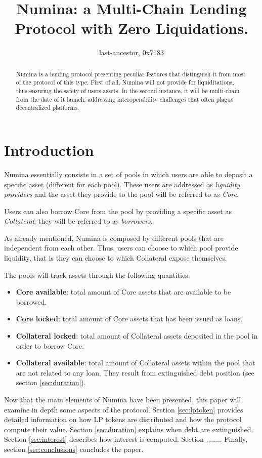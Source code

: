 \documentclass[12pt]{paper}
\title{Numina: a Multi-Chain Lending Protocol with Zero Liquidations.}
\author{last-ancestor, 0x7183}
\date{}
\begin{document}
\maketitle


\begin{abstract}
	Numina is a lending protocol presenting peculiar features that distinguish it from most of the protocol of this type. First of all, Numina will not provide for liquiditations, thus ensuring the safety of users assets. In the second instance, it will be multi-chain from the date of it launch,  addressing interoperability challenges that often plague decentralized platforms.
\end{abstract}
	

\section{Introduction}
\label{sec:introduction}
	Numina essentially consists in a set of pools in which users are able to deposit a specific asset (different for each pool). These users are addressed as \textit{liquidity providers} and the asset they provide to the pool will be referred to as \textit{Core}.
	\par Users can also borrow Core from the pool by providing a specific asset as \textit{Collateral}: they will be referred to as \textit{borrowers}.
	\par As already mentioned, Numina is composed by different pools that are independent from each other. Thus, users can choose to which pool provide liquidity, that is they can choose to which Collateral expose themselves.
	\par The pools will track assets through the following quantities.
	\begin{itemize}
		\item \textbf{Core available}: total amount of Core assets that are available to be borrowed.
		\item \textbf{Core locked}: total amount of Core assets that has been issued as loans.
		\item \textbf{Collateral locked}: total amount of Collateral assets deposited in the pool in order to borrow Core.
		\item \textbf{Collateral available}: total amount of Collateral assets within the pool that are not related to any loan. They result from extinguished debt position (see section \ref{sec:duration}).
	\end{itemize} 
	Now that the main elements of Numina have been presented, this paper will examine in depth some aspects of the protocol. Section \ref{sec:lptoken} provides detailed information on how LP tokens are distributed and how the protocol compute their value. Section \ref{sec:duration} explains when debt are extinguished. Section \ref{sec:interest} describes how interest is computed. Section ........ Finally, section \ref{sec:conclusions} concludes the paper. 
	
\end{document}
